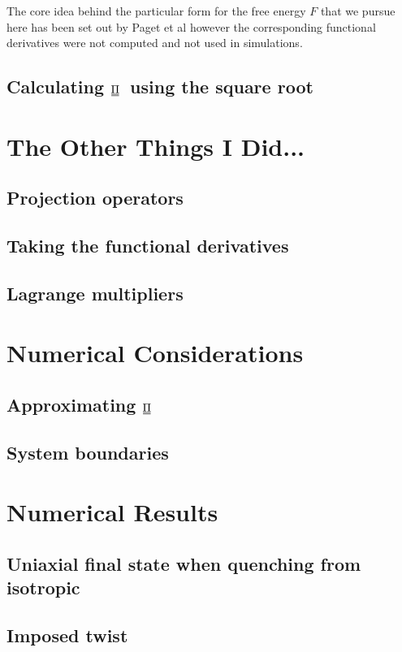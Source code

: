 \documentclass[12pt]{article}
\newcommand{\duf}[2]{\stackunder[0.5pt]{\stackunder[0.8pt]{\stackunder[1pt]{\ensuremath{#1}}{\rule{\widthof{\ensuremath{#2}}*\real{0.9}}{.1ex}}}{\rule{\widthof{\ensuremath{#2}}*\real{0.9}}{.1ex}}}{}}
\newcommand{\du}[1]{\duf{#1}{#1}}
\newcommand{\PP}{\ensuremath{\du{\Pi}}}
\begin{document}
    The core idea behind the particular form for the free energy $F$ that we pursue here has been set out by Paget et al\cite{pagetSmecticLayeringLandau2022,pagetComplextensorTheorySimple2023,pagetComplexTensorsSimple2023} however the corresponding functional derivatives were not computed and not used in simulations.

    \subsection{Calculating \PP\ using the square root}

\section{The Other Things I Did...}
    \subsection{Projection operators}
    \subsection{Taking the functional derivatives}
    \subsection{Lagrange multipliers}

\section{Numerical Considerations}
    \subsection{Approximating \PP{}}
    \subsection{System boundaries }

\section{Numerical Results}
    \subsection{Uniaxial final state when quenching from isotropic}
    \subsection{Imposed twist}
\end{document}
